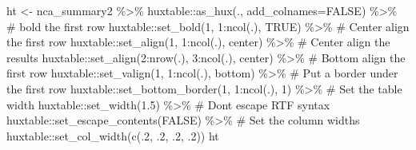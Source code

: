 \documentclass[
  letterpaper,
  DIV=11,
  numbers=noendperiod]{scrreprt}
\newenvironment{Shaded}{\begin{snugshade}}{\end{snugshade}}
\newcommand{\AttributeTok}[1]{\textcolor[rgb]{0.40,0.45,0.13}{#1}}
\newcommand{\CommentTok}[1]{\textcolor[rgb]{0.37,0.37,0.37}{#1}}
\newcommand{\ConstantTok}[1]{\textcolor[rgb]{0.56,0.35,0.01}{#1}}
\newcommand{\DecValTok}[1]{\textcolor[rgb]{0.68,0.00,0.00}{#1}}
\newcommand{\FloatTok}[1]{\textcolor[rgb]{0.68,0.00,0.00}{#1}}
\newcommand{\FunctionTok}[1]{\textcolor[rgb]{0.28,0.35,0.67}{#1}}
\newcommand{\NormalTok}[1]{\textcolor[rgb]{0.00,0.23,0.31}{#1}}
\newcommand{\OtherTok}[1]{\textcolor[rgb]{0.00,0.23,0.31}{#1}}
\newcommand{\SpecialCharTok}[1]{\textcolor[rgb]{0.37,0.37,0.37}{#1}}
\newcommand{\StringTok}[1]{\textcolor[rgb]{0.13,0.47,0.30}{#1}}
\begin{document}
\begin{Shaded}
\begin{Highlighting}[]
\NormalTok{ht }\OtherTok{\textless{}{-}}\NormalTok{ nca\_summary2 }\SpecialCharTok{\%\textgreater{}\%} 
\NormalTok{  huxtable}\SpecialCharTok{::}\FunctionTok{as\_hux}\NormalTok{(., }\AttributeTok{add\_colnames=}\ConstantTok{FALSE}\NormalTok{) }\SpecialCharTok{\%\textgreater{}\%}
  \CommentTok{\# bold the first row}
\NormalTok{  huxtable}\SpecialCharTok{::}\FunctionTok{set\_bold}\NormalTok{(}\DecValTok{1}\NormalTok{, }\DecValTok{1}\SpecialCharTok{:}\FunctionTok{ncol}\NormalTok{(.), }\ConstantTok{TRUE}\NormalTok{) }\SpecialCharTok{\%\textgreater{}\%} 
  \CommentTok{\# Center align the first row }
\NormalTok{  huxtable}\SpecialCharTok{::}\FunctionTok{set\_align}\NormalTok{(}\DecValTok{1}\NormalTok{, }\DecValTok{1}\SpecialCharTok{:}\FunctionTok{ncol}\NormalTok{(.), }\StringTok{\textquotesingle{}center\textquotesingle{}}\NormalTok{) }\SpecialCharTok{\%\textgreater{}\%} 
  \CommentTok{\# Center align the results}
\NormalTok{  huxtable}\SpecialCharTok{::}\FunctionTok{set\_align}\NormalTok{(}\DecValTok{2}\SpecialCharTok{:}\FunctionTok{nrow}\NormalTok{(.), }\DecValTok{3}\SpecialCharTok{:}\FunctionTok{ncol}\NormalTok{(.), }\StringTok{\textquotesingle{}center\textquotesingle{}}\NormalTok{) }\SpecialCharTok{\%\textgreater{}\%}
  \CommentTok{\# Bottom align the first row}
\NormalTok{  huxtable}\SpecialCharTok{::}\FunctionTok{set\_valign}\NormalTok{(}\DecValTok{1}\NormalTok{, }\DecValTok{1}\SpecialCharTok{:}\FunctionTok{ncol}\NormalTok{(.), }\StringTok{\textquotesingle{}bottom\textquotesingle{}}\NormalTok{) }\SpecialCharTok{\%\textgreater{}\%} 
  \CommentTok{\# Put a border under the first row}
\NormalTok{  huxtable}\SpecialCharTok{::}\FunctionTok{set\_bottom\_border}\NormalTok{(}\DecValTok{1}\NormalTok{, }\DecValTok{1}\SpecialCharTok{:}\FunctionTok{ncol}\NormalTok{(.), }\DecValTok{1}\NormalTok{) }\SpecialCharTok{\%\textgreater{}\%} 
  \CommentTok{\# Set the table width}
\NormalTok{  huxtable}\SpecialCharTok{::}\FunctionTok{set\_width}\NormalTok{(}\FloatTok{1.5}\NormalTok{) }\SpecialCharTok{\%\textgreater{}\%} 
  \CommentTok{\# Don\textquotesingle{}t escape RTF syntax}
\NormalTok{  huxtable}\SpecialCharTok{::}\FunctionTok{set\_escape\_contents}\NormalTok{(}\ConstantTok{FALSE}\NormalTok{) }\SpecialCharTok{\%\textgreater{}\%} 
  \CommentTok{\# Set the column widths}
\NormalTok{  huxtable}\SpecialCharTok{::}\FunctionTok{set\_col\_width}\NormalTok{(}\FunctionTok{c}\NormalTok{(.}\DecValTok{2}\NormalTok{, .}\DecValTok{2}\NormalTok{, .}\DecValTok{2}\NormalTok{, .}\DecValTok{2}\NormalTok{)) }
\NormalTok{ht}
\end{Highlighting}
\end{Shaded}
\end{document}

